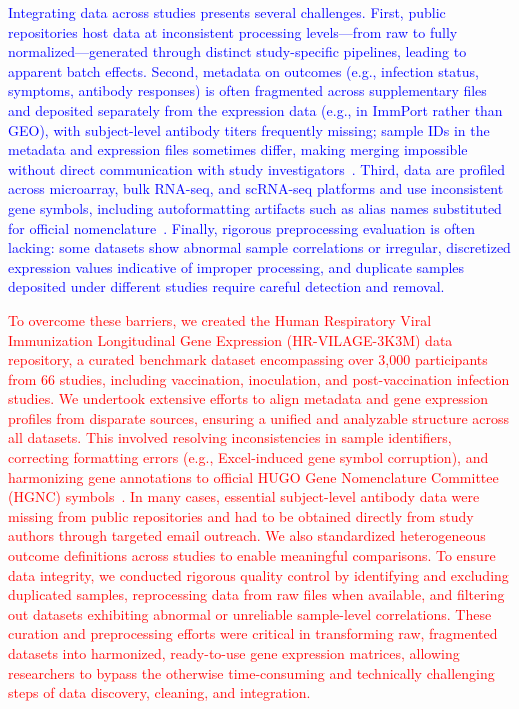 \documentclass[
  12pt]{article}
\newcommand{\delmark}[1]{\textcolor{red}{#1}}
\newcommand{\addmark}[1]{\textcolor{blue}{#1}}
\begin{document}
\medskip
\addmark{Integrating data across studies presents several challenges. First, public repositories host data at inconsistent processing levels---from raw to fully normalized---generated through distinct study-specific pipelines, leading to apparent batch effects. Second, metadata on outcomes (e.g., infection status, symptoms, antibody responses) is often fragmented across supplementary files and deposited separately from the expression data (e.g., in ImmPort rather than GEO), with subject-level antibody titers frequently missing; sample IDs in the metadata and expression files sometimes differ, making merging impossible without direct communication with study investigators~\citep{grewe2024mva,lee2022prior,furman2017expression}. Third, data are profiled across microarray, bulk RNA-seq, and scRNA-seq platforms and use inconsistent gene symbols, including autoformatting artifacts such as alias names substituted for official nomenclature~\citep{ziemann2016gene}. Finally, rigorous preprocessing evaluation is often lacking: some datasets show abnormal sample correlations or irregular, discretized expression values indicative of improper processing, and duplicate samples deposited under different studies require careful detection and removal.}

\delmark{To overcome these barriers, we created the Human Respiratory Viral Immunization Longitudinal Gene Expression (HR-VILAGE-3K3M) data repository, a curated benchmark dataset encompassing over 3,000 participants from 66 studies, including vaccination, inoculation, and post-vaccination infection studies. We undertook extensive efforts to align metadata and gene expression profiles from disparate sources, ensuring a unified and analyzable structure across all datasets. This involved resolving inconsistencies in sample identifiers, correcting formatting errors (e.g., Excel-induced gene symbol corruption), and harmonizing gene annotations to official HUGO Gene Nomenclature Committee (HGNC) symbols~\citep{bruford2020guidelines}. In many cases, essential subject-level antibody data were missing from public repositories and had to be obtained directly from study authors through targeted email outreach. We also standardized heterogeneous outcome definitions across studies to enable meaningful comparisons. To ensure data integrity, we conducted rigorous quality control by identifying and excluding duplicated samples, reprocessing data from raw files when available, and filtering out datasets exhibiting abnormal or unreliable sample-level correlations. These curation and preprocessing efforts were critical in transforming raw, fragmented datasets into harmonized, ready-to-use gene expression matrices, allowing researchers to bypass the otherwise time-consuming and technically challenging steps of data discovery, cleaning, and integration.}
\end{document}
